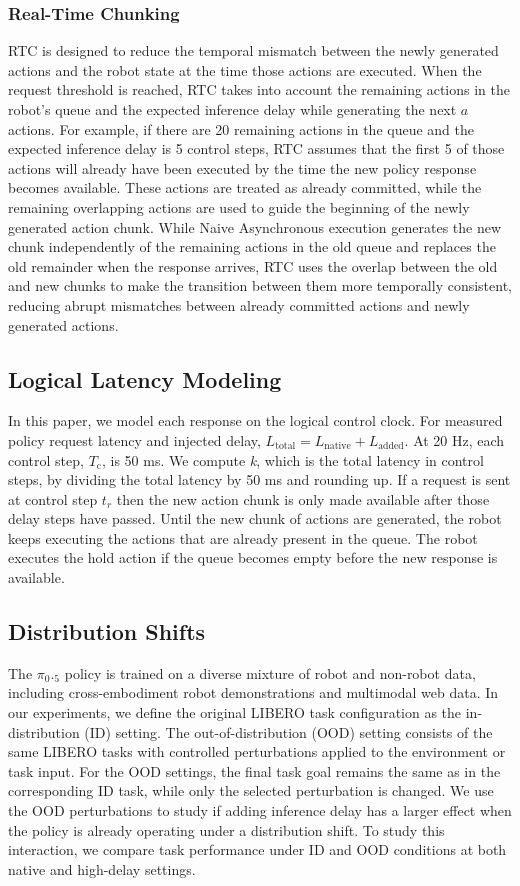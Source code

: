 \documentclass{article}
\begin{document}
\subsubsection{Real-Time Chunking}
RTC is designed to reduce the temporal mismatch between the newly generated actions and the robot state at the time those actions are executed. When the request threshold is reached, RTC takes into account the remaining actions in the robot's queue and the expected inference delay while generating the next \(a\) actions. For example, if there are 20 remaining actions in the queue and the expected inference delay is 5 control steps, RTC assumes that the first 5 of those actions will already have been executed by the time the new policy response becomes available. These actions are treated as already committed, while the remaining overlapping actions are used to guide the beginning of the newly generated action chunk. While Naive Asynchronous execution generates the new chunk independently of the remaining actions in the old queue and replaces the old remainder when the response arrives, RTC uses the overlap between the old and new chunks to make the transition between them more temporally consistent, reducing abrupt mismatches between already committed actions and newly generated actions.

\subsection{Logical Latency Modeling}
In this paper, we model each response on the logical control clock. For measured policy request latency and injected delay,
$L_{\mathrm{total}} = L_{\mathrm{native}} + L_{\mathrm{added}}$. At 20 Hz, each control step, \(T_{\mathrm{c}}\), is 50 ms. We compute \textit{k}, which is the total latency in control steps, by dividing the total latency by 50 ms and rounding up. If a request is sent at control step \(t_r\) then the new action chunk is only made available after those delay steps have passed.
Until the new chunk of actions are generated, the robot keeps executing the actions that are already present in the queue. The robot executes the hold action if the queue becomes empty before the new response is available.

\subsection{Distribution Shifts}
The $\pi_0._5$ policy is trained on a diverse mixture of robot and non-robot data, including cross-embodiment robot demonstrations and multimodal web data. In our experiments, we define the original LIBERO task configuration as the in-distribution (ID) setting. The out-of-distribution (OOD) setting consists of the same LIBERO tasks with controlled perturbations applied to the environment or task input. For the OOD settings, the final task goal remains the same as in the corresponding ID task, while only the selected perturbation is changed. We use the OOD perturbations to study if adding inference delay has a larger effect when the policy is already operating under a distribution shift. To study this interaction, we compare task performance under ID and OOD conditions at both native and high-delay settings.
\end{document}
